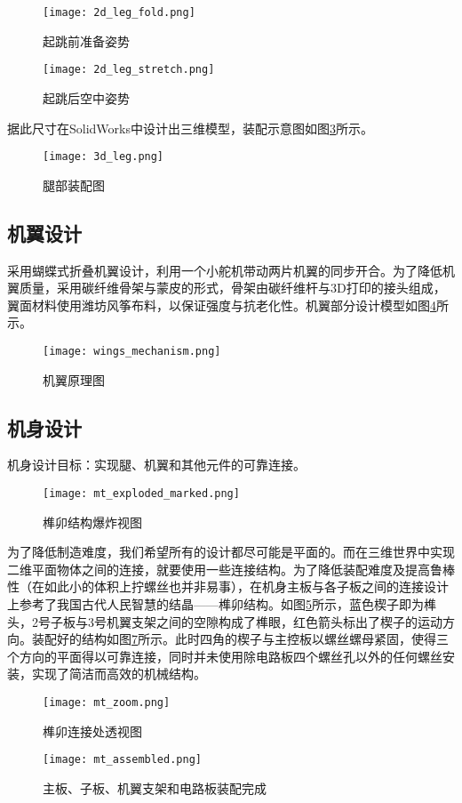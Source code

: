 \begin{figure}[H]
  \centering%
  \texttt{[image: 2d\_leg\_fold.png]}
  \caption{起跳前准备姿势}
  \label{fig:2d_leg_fold}
\end{figure}
\begin{figure}[H]
  \centering%
  \texttt{[image: 2d\_leg\_stretch.png]}
  \caption{起跳后空中姿势}
  \label{fig:2d_leg_stretch}
\end{figure}

据此尺寸在SolidWorks中设计出三维模型，装配示意图如图\ref{fig:3d_leg}所示。
\begin{figure}[H]
  \centering%
  \texttt{[image: 3d\_leg.png]}
  \caption{腿部装配图}
  \label{fig:3d_leg}
\end{figure}

\subsection{机翼设计}
\label{sec:wings}
采用蝴蝶式\cite{EPFL}折叠机翼设计，利用一个小舵机带动两片机翼的同步开合。为了降低机翼质量，采用碳纤维骨架与蒙皮的形式，骨架由碳纤维杆与3D打印的接头组成，翼面材料使用潍坊风筝布料，以保证强度与抗老化性。机翼部分设计模型如图\ref{fig:wings_mechanism}所示。
\begin{figure}[H]
  \centering%
  \texttt{[image: wings\_mechanism.png]}
  \caption{机翼原理图}
  \label{fig:wings_mechanism}
\end{figure}

\subsection{机身设计}
机身设计目标：实现腿、机翼和其他元件的可靠连接。
\begin{figure}[H]
  \centering%
  \texttt{[image: mt\_exploded\_marked.png]}
  \caption{榫卯结构爆炸视图}
  \label{fig:mt_exploded}
\end{figure}
为了降低制造难度，我们希望所有的设计都尽可能是平面的。而在三维世界中实现二维平面物体之间的连接，就要使用一些连接结构。为了降低装配难度及提高鲁棒性（在如此小的体积上拧螺丝也并非易事），在机身主板与各子板之间的连接设计上参考了我国古代人民智慧的结晶——榫卯结构。如图\ref{fig:mt_exploded}所示，蓝色楔子即为榫头，2号子板与3号机翼支架之间的空隙构成了榫眼，红色箭头标出了楔子的运动方向。装配好的结构如图\ref{fig:mt_assembled}所示。此时四角的楔子与主控板以螺丝螺母紧固，使得三个方向的平面得以可靠连接，同时并未使用除电路板四个螺丝孔以外的任何螺丝安装，实现了简洁而高效的机械结构。
\begin{figure}[H]
  \centering
  {\texttt{[image: mt\_zoom.png]}}
  \caption{榫卯连接处透视图}
  \label{fig:mt_zoom}
\end{figure}
\begin{figure}[H]
  \centering
  {\texttt{[image: mt\_assembled.png]}}
  \caption{主板、子板、机翼支架和电路板装配完成}
  \label{fig:mt_assembled}
\end{figure}
